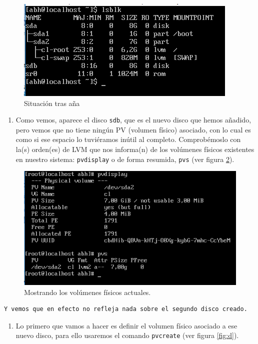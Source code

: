 \documentclass[
]{book}
\providecommand{\tightlist}{%
  \setlength{\itemsep}{0pt}\setlength{\parskip}{0pt}}
\begin{document}
\begin{figure}

{\centering \includegraphics[width=0.6\linewidth]{images/b} 

}

\caption{Situación tras aña}\label{fig:b}
\end{figure}

\begin{enumerate}
\def\labelenumi{\arabic{enumi}.}
\setcounter{enumi}{2}
\tightlist
\item
  Como vemos, aparece el disco \texttt{sdb}, que es el nuevo disco que hemos añadido, pero vemos que no tiene ningún PV (volumen físico) asociado, con lo cual es como si ese espacio lo tuviéramos inútil al completo. Comprobémoslo con la(s) orden(es) de LVM que nos informa(n) de los volúmenes físicos existentes en nuestro sistema: \texttt{pvdisplay} o de forma resumida, \texttt{pvs} (ver figura \ref{fig:c}).
\end{enumerate}

\begin{figure}

{\centering \includegraphics[width=0.6\linewidth]{images/c} 

}

\caption{Mostrando los volúmenes físicos actuales. }\label{fig:c}
\end{figure}

\begin{verbatim}
Y vemos que en efecto no refleja nada sobre el segundo disco creado. 
\end{verbatim}

\begin{enumerate}
\def\labelenumi{\arabic{enumi}.}
\setcounter{enumi}{3}
\tightlist
\item
  Lo primero que vamos a hacer es definir el volumen físico asociado a ese nuevo disco, para ello usaremos el comando \texttt{pvcreate} (ver figura \ref{fig:d}).
\end{enumerate}
\end{document}
